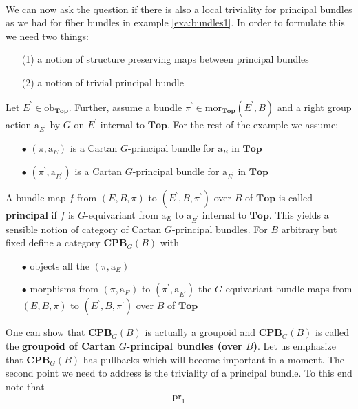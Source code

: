 \begin{exa}[Bundles 2]
\\
We can now ask the question if there is also a local triviality for principal bundles as we had for fiber bundles in example \ref{exa:bundles1}. In order to formulate this we need two things:
\begin{enumerate}
\item[(1)]
a notion of structure preserving maps between principal bundles
\item[(2)]
a notion of trivial principal bundle
\end{enumerate}
Let $E^{\backprime} \in \mathrm{ob}_{\mathbf{Top}}$. Further, assume a bundle $\pi^{\backprime} \in \mathrm{mor}_{\mathbf{Top}}(E^{\backprime},B)$ and a right group action $\mathrm{a}_{E^{\backprime}}$ by $G$ on $E^{\backprime}$ internal to $\mathbf{Top}$. For the rest of the example we assume:
\begin{enumerate}
\item[$\bullet$]
$(\pi,\mathrm{a}_{E})$ is a Cartan $G$-principal bundle for $\mathrm{a}_{E}$ in $\mathbf{Top}$
\item[$\bullet$]
$(\pi^{\backprime},\mathrm{a}_{E^{\backprime}})$ is a Cartan $G$-principal bundle for $\mathrm{a}_{E^{\backprime}}$ in $\mathbf{Top}$
\end{enumerate}
A bundle map $f$ from $(E,B,\pi)$ to $(E^{\backprime},B,\pi^{\backprime})$ over $B$ of $\mathbf{Top}$ is called \textbf{principal} if $f$ is $G$-equivariant from $\mathrm{a}_{E}$ to $\mathrm{a}_{E^{\backprime}}$ internal to $\mathbf{Top}$. This yields a sensible notion of category of Cartan $G$-principal bundles. For $B$ arbitrary but fixed define a category $\mathbf{CPB}_{G}(B)$ with
\begin{enumerate}
\item[$\bullet$]
objects all the $(\pi,\mathrm{a}_{E})$
\item[$\bullet$]
morphisms from $(\pi,\mathrm{a}_{E})$ to $(\pi^{\backprime},\mathrm{a}_{E^{\backprime}})$ the $G$-equivariant bundle maps from $(E,B,\pi)$ to $(E^{\backprime},B,\pi^{\backprime})$ over $B$ of $\mathbf{Top}$
\end{enumerate}
One can show that $\mathbf{CPB}_{G}(B)$ is actually a groupoid and $\mathbf{CPB}_{G}(B)$ is called the \textbf{groupoid of Cartan $G$-principal bundles (over $B$)}. Let us emphasize that $\mathbf{CPB}_{G}(B)$ has pullbacks which will become important in a moment. The second point we need to address is the triviality of a principal bundle. To this end note that
\begin{align*}
  \mathrm{pr}_{1}

\end{align*}
\end{exa}
